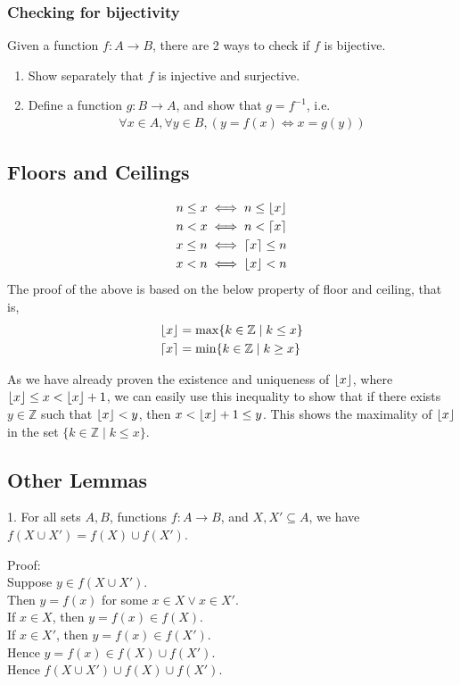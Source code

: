 \documentclass{article}
\DeclarePairedDelimiter\ceil{\lceil}{\rceil}
\DeclarePairedDelimiter\floor{\lfloor}{\rfloor}
\begin{document}
\subsubsection{Checking for bijectivity}
Given a function $f: A\rightarrow B$, there are 2 ways to check if $f$ is bijective.
\begin{enumerate}
	\item Show separately that $f$ is injective and surjective.
	\item Define a function $g: B\rightarrow A$, and show that $g=f^{-1}$, i.e.
	\begin{align*}
		\forall x\in A, \forall y\in B, (y=f(x)\iff x=g(y))
	\end{align*}
\end{enumerate}

\subsection{Floors and Ceilings}
\begin{align*}
    &n\leq x\iff n\leq \floor{x}\\
    &n<x\iff n<\ceil{x}\\
    &x\leq n\iff \ceil{x}\leq n\\
    &x<n \iff \floor{x}<n
\end{align*}
The proof of the above is based on the below property of floor and ceiling, that is,
\begin{align*}
    &\floor{x}=\max \{k\in \mathbb{Z}\mid k\leq x\}\\
    &\ceil{x}=\min \{k\in \mathbb{Z}\mid k\geq x\}
\end{align*}

As we have already proven the existence and uniqueness of $\floor{x}$, where $\floor{x}\leq x<\floor{x}+1$, we can easily use this inequality to show that if there exists $y\in \mathbb{Z}$ such that $\floor{x}<y$, then $x<\floor{x}+1\leq y$. This shows the maximality of $\floor{x}$ in the set $\{k\in \mathbb{Z}\mid k\leq x\}$.

\subsection{Other Lemmas}

1. For all sets $A,B$, functions $f: A\rightarrow B$, and $X,X'\subseteq A$, we have $f(X\cup X')=f(X)\cup f(X')$.

Proof:\\
Suppose $y\in f(X\cup X')$. \\Then $y=f(x)$ for some $x\in X\lor x\in X'$. \\
If $x\in X$, then $y=f(x)\in f(X)$. \\If $x\in X'$, then $y=f(x)\in f(X')$. \\ Hence $y=f(x)\in f(X)\cup f(X').$\\
Hence $f(X\cup X')\cup f(X)\cup f(X')$.
\end{document}
